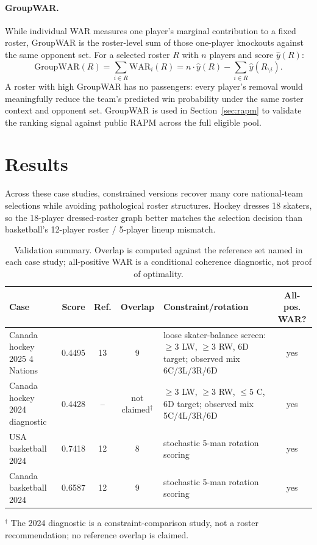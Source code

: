 \documentclass[11pt,letterpaper]{article}
\begin{document}
\paragraph{GroupWAR.} While individual WAR measures one player's
marginal contribution to a fixed roster, GroupWAR is the roster-level
sum of those one-player knockouts against the same opponent set. For a
selected roster $R$ with $n$ players and score $\hat{y}(R)$:
\[
  \mathrm{GroupWAR}(R) = \sum_{i \in R} \mathrm{WAR}_i(R)
  = n\cdot\hat{y}(R) - \sum_{i \in R}\hat{y}(R_{\setminus i}).
\]
A roster with high GroupWAR has no passengers: every player's removal
would meaningfully reduce the team's predicted win probability under
the same roster context and opponent set. GroupWAR is used in
Section~\ref{sec:rapm} to validate the ranking signal against public
RAPM across the full eligible pool.

\section{Results}
\label{sec:results}

Across these case studies, constrained versions recover many core
national-team selections while avoiding pathological roster structures.
Hockey dresses 18 skaters, so the 18-player dressed-roster graph better
matches the selection decision than basketball's 12-player roster /
5-player lineup mismatch.

\begin{table}[htbp]
  \centering
  \scriptsize
  \caption{Validation summary. Overlap is computed against the
    reference set named in each case study; all-positive WAR is a
    conditional coherence diagnostic, not proof of optimality.}
  \begin{tabular}{@{}l c c c p{5.0cm} c@{}}
    \toprule
    Case & Score & Ref. & Overlap & Constraint/rotation & All-pos. WAR? \\
    \midrule
    Canada hockey 2025 4 Nations & 0.4495 & 13 & 9 & loose skater-balance screen: $\geq 3$ LW, $\geq 3$ RW, 6D target; observed mix 6C/3L/3R/6D & yes \\
    Canada hockey 2024 diagnostic & 0.4428 & -- & not claimed$^\dagger$ & $\geq 3$ LW, $\geq 3$ RW, $\leq 5$ C, 6D target; observed mix 5C/4L/3R/6D & yes \\
    USA basketball 2024 & 0.7418 & 12 & 8 & stochastic 5-man rotation scoring & yes \\
    Canada basketball 2024 & 0.6587 & 12 & 9 & stochastic 5-man rotation scoring & yes \\
    \bottomrule
  \end{tabular}
  \par\smallskip
  {\scriptsize $^\dagger$ The 2024 diagnostic is a constraint-comparison study, not a roster
  recommendation; no reference overlap is claimed.}
\end{table}
\end{document}
